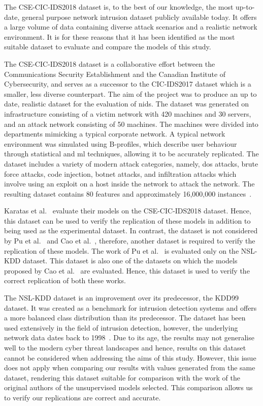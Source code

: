 The CSE-CIC-IDS2018 dataset is, to the best of our knowledge, the most
up-to-date, general purpose network intrusion dataset publicly available today.
It offers a large volume of data containing diverse attack scenarios and a
realistic network environment. It is for these reasons that it has been
identified as the most suitable dataset to evaluate and compare the models of
this study.

The CSE-CIC-IDS2018 dataset is a collaborative effort between the
Communications Security Establishment and the Canadian Institute of
Cybersecurity, and serves as a successor to the CIC-IDS2017 dataset which is a
smaller, less diverse counterpart. The aim of the project was to produce an up
to date, realistic dataset for the evaluation of \gls{nids}. The dataset was
generated on infrastructure consisting of a victim network with 420 machines
and 30 servers, and an attack network consisting of 50 machines. The machines
were divided into departments mimicking a typical corporate network. A typical
network environment was simulated using B-profiles, which describe user
behaviour through statistical and \gls{ml} techniques, allowing it to be
accurately replicated. The dataset includes a variety of modern attack
categories, namely, \gls{dos} attacks, brute force attacks, code injection,
botnet attacks, and infiltration attacks which involve using an exploit on a
host inside the network to attack the network. The resulting dataset contains
80 features and approximately 16,000,000 instances~\cite{cic2018, cic2018data}.

Karatas et al.~\cite{Karatas} evaluate their models on the CSE-CIC-IDS2018
dataset. Hence, this dataset can be used to verify the replication of these
models in addition to being used as the experimental dataset. In contrast, the
dataset is not considered by Pu et al.~\cite{Pu} and Cao et al.~\cite{Cao},
therefore, another dataset is required to verify the replication of these
models. The work of Pu et al.~\cite{Pu} is evaluated only on the NSL-KDD
dataset. This dataset is also one of the datasets on which the models proposed
by Cao et al.~\cite{Cao} are evaluated. Hence, this dataset is used to verify
the correct replication of both these works.

The NSL-KDD dataset is an improvement over its predecessor, the KDD99 dataset.
It was created as a benchmark for intrusion detection systems and offers a more
balanced class distribution than its predecessor. The dataset has been used
extensively in the field of intrusion detection, however, the underlying
network data dates back to 1998~\cite{nsl}. Due to its age, the results may not
generalise well to the modern cyber threat landscapes and hence, results on
this dataset cannot be considered when addressing the aims of this study.
However, this issue does not apply when comparing our results with values
generated from the same dataset, rendering this dataset suitable for comparison
with the work of the original authors of the unsupervised models selected. This
comparison allows us to verify our replications are correct and accurate.

